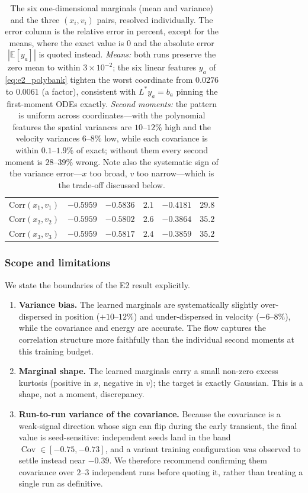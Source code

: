 \documentclass[11pt]{article}
\newcommand{\E}{\mathbb{E}}
\theoremstyle{plain}
\begin{document}
\begin{table}[H]
\begin{tabular}{@{}lrrrrr@{}}
$\mathrm{Corr}(x_1,v_1)$ & $-0.5959$ & $-0.5836$ & $2.1$ & $-0.4181$ & $29.8$\\
$\mathrm{Corr}(x_2,v_2)$ & $-0.5959$ & $-0.5802$ & $2.6$ & $-0.3864$ & $35.2$\\
$\mathrm{Corr}(x_3,v_3)$ & $-0.5959$ & $-0.5817$ & $2.4$ & $-0.3859$ & $35.2$\\
\bottomrule
\end{tabular}
\caption{ The six one-dimensional marginals (mean and variance) and the three $(x_i,v_i)$ pairs, resolved individually. The error column is the relative error in percent, except for the means, where the exact value is $0$ and the absolute error $|\E[y_a]|$ is quoted instead. \emph{Means:} both runs preserve the zero mean to within $3\times10^{-2}$; the six linear features $y_a$ of \eqref{eq:e2_polybank} tighten the worst coordinate from $0.0276$ to $0.0061$ (a factor), consistent with $L^*y_a=b_a$ pinning the first-moment ODEs exactly. \emph{Second moments:} the pattern is uniform across coordinates—with the polynomial features the spatial variances are $10$--$12\%$ high and the velocity variances $6$--$8\%$ low, while each covariance is within $0.1$--$1.9\%$ of exact; without them every second moment is $28$--$39\%$ wrong. Note also the systematic sign of the variance error---$x$ too broad, $v$ too narrow---which is the trade-off discussed below.}
\label{tab:e2_poly_marg}
\end{table}



\subsubsection{Scope and limitations}
\label{subsec:e2_limits}

We state the boundaries of the E2 result explicitly.
\begin{enumerate}

\item[(a)] \textbf{Variance bias.} The learned marginals are systematically slightly over-dispersed in position ($+10$--$12\%$) and under-dispersed in velocity ($-6$--$8\%$), while the covariance and energy are accurate. The flow captures the correlation structure more faithfully than the individual second moments at this training budget.

\item[(b)] \textbf{Marginal shape.} The learned marginals carry a small non-zero excess kurtosis (positive in $x$, negative in $v$); the target is exactly Gaussian. This is a shape, not a moment, discrepancy.

\item[(c)] \textbf{Run-to-run variance of the covariance.} Because the covariance is a weak-signal direction whose sign can flip during the early transient, the final value is seed-sensitive: independent seeds land in the band $\operatorname{Cov}\in[-0.75,-0.73]$, and a variant training configuration was observed to settle instead near $-0.39$. We therefore recommend confirming them covariance over $2$--$3$ independent runs before quoting it, rather than treating a single run as definitive.
\end{enumerate}
\end{document}
